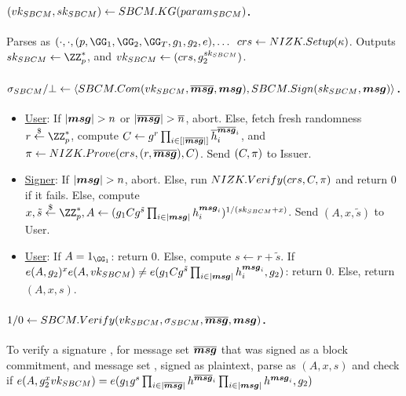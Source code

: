 \paragraph{$(vk_{SBCM},sk_{SBCM}) \gets SBCM.KG(param_{SBCM})$.} %
Parses \SBCMparm as $(\cdot,\cdot,(p,\GG_1,\GG_2,\GG_T,\gen{g}_1,\gen{g}_2,e),
\dots$ $crs \gets NIZK.Setup(\kappa)$. Outputs $\SBCMsk \gets \ZZ^*_p$,
and $vk_{SBCM} \gets (crs,g_2^{sk_{SBCM}})$.

\paragraph{$\sigma_{SBCM}/\bot \gets \langle SBCM.Com(vk_{SBCM},\overline{\boldsymbol{msg}},
  \boldsymbol{msg}), SBCM.Sign(sk_{SBCM},\boldsymbol{msg}) \rangle$.} %

\begin{itemize}
\item \underline{User}: If $|\smsg|>\nattrs$ or $|\overline{\smsg}|>\tnattrs$,
  abort. Else, fetch fresh randomness $r \getr \ZZ^*_p$, compute $C \gets
  g^r\prod_{i \in [|\overline{\boldsymbol{msg}}|]}\overline{h}_i^{\overline{\boldsymbol{msg}}_i}$,
  and $\pi \gets NIZK.Prove(crs,(r,\overline{\boldsymbol{msg}}),C)$.
  Send $(C,\pi)$ to Issuer.
\item \underline{Signer}: If $|\smsg|>\nattrs$, abort. Else, run $NIZK.Verify
  (crs,C,\pi)$ and return $0$ if it fails. Else, compute
  $x,\tilde{s} \getr \ZZ^*_p, A \gets (\gen{g}_1\Ccom \gen{g}^{\tilde{s}}
  \prod_{i \in |\smsg|}\gen{h}_i^{\smsg_i})^{1/(\SBCMsk+x)}$. Send
  $(A,x,\tilde{s})$ to User.
\item \underline{User}: If $A = 1_{\GG_1}$: return $0$. Else, compute
  $s \gets r + \tilde{s}$. If $e(A,g_2)^xe(A,vk_{SBCM}) \neq
  e(g_1Cg^{\tilde{s}}\prod_{i \in |\boldsymbol{msg}|}h_i^{\boldsymbol{msg}_i},
  g_2)$: return $0$. Else, return $(A,x,s)$.
\end{itemize}

\paragraph{$1/0 \gets SBCM.Verify(vk_{SBCM},\sigma_{SBCM},\overline{\boldsymbol{msg}},\boldsymbol{msg})$.} %
To verify a signature \SBCMsig, for message set $\overline{\boldsymbol{msg}}$ that was
signed as a block commitment, and message set \smsg, signed as plaintext, parse
\SBCMsig as $(A,x,s)$ and check if $e(A,g_2^xvk_{SBCM}) =
e(g_1g^s\prod_{i \in |\overline{\boldsymbol{msg}}|}h^{\overline{\boldsymbol{msg}}_i}
\prod_{i \in |\boldsymbol{msg}|}h^{\boldsymbol{msg}_i},g_2)$

